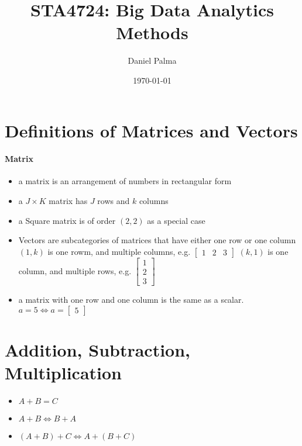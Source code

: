\documentclass{article}
\author{Daniel Palma}
\date{\today}
\title{STA4724: Big Data Analytics Methods}
\newtheorem{theorem}{Theorem}
\theoremstyle{definition}
\theoremstyle{remark}
\begin{document}
\maketitle
\newpage
\tableofcontents
\newpage


\section{Definitions of Matrices and Vectors}

\paragraph{Matrix}
\begin{itemize}
    \item a matrix is an arrangement of numbers in rectangular form
    \item a $J \times K$ matrix has $J$ rows and $k$ columns
    \item a Square matrix is of order $(2,2)$ as a special case
    \item Vectors are subcategories of matrices that have either one row or one column
    \subitem $(1,k)$ is one rowm, and multiple columns, e.g. $\begin{bmatrix} 1 & 2 & 3 \end{bmatrix}$
    \subitem $(k,1)$ is one column, and multiple rows, e.g. $\begin{bmatrix} 1 \\ 2 \\ 3 \end{bmatrix}$
    \item a matrix with one row and one column is the same as a scalar. $a = 5 \Leftrightarrow a = \begin{bmatrix}
        5
    \end{bmatrix}$
\end{itemize}

\section{Addition, Subtraction, Multiplication}

\begin{itemize}
    \item $A + B = C$
    \item $A + B \Leftrightarrow B + A$
    \item $(A + B) + C \Leftrightarrow A + (B + C)$
\end{itemize}
\end{document}
